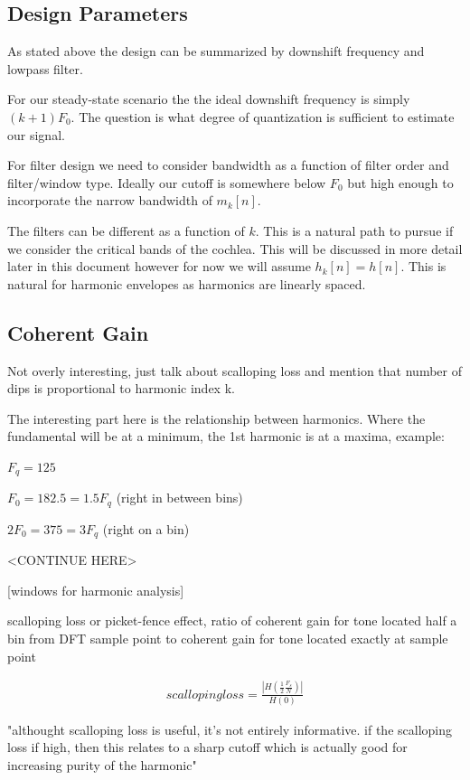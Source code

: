 \documentclass [11pt, proquest] {uwthesis}[2015/03/03]
\begin{document}
\subsection{Design Parameters}

As stated above the design can be summarized by downshift frequency and lowpass filter.

For our steady-state scenario the the ideal downshift frequency is simply $(k+1)F_0$.  The question is what degree of quantization is sufficient to estimate our signal.

For filter design we need to consider bandwidth as a function of filter order and filter/window type.  Ideally our cutoff is somewhere below $F_0$ but high enough to incorporate the narrow bandwidth of $m_k[n]$.

The filters can be different as a function of $k$.  This is a natural path to pursue if we consider the critical bands of the cochlea.  This will be discussed in more detail later in this document however for now we will assume $h_k[n] = h[n]$.  This is natural for harmonic envelopes as harmonics are linearly spaced.

\subsection{Coherent Gain}

Not overly interesting, just talk about scalloping loss and mention that number of dips is proportional to harmonic index k.

The interesting part here is the relationship between harmonics.  Where the fundamental will be at a minimum, the 1st harmonic is at a maxima, example:

$F_q = 125$

$F_0 = 182.5 = 1.5 F_q$ (right in between bins)

$2F_0 = 375 = 3 F_q$ (right on a bin)

<CONTINUE HERE>

[windows for harmonic analysis]

scalloping loss or picket-fence effect, ratio of coherent gain for tone located half a bin from DFT sample point to coherent gain for tone located exactly at sample point

\begin{align}
scalloping loss = \frac{| H(\frac{1}{2} \frac{F_s}{N}) |}{H(0)}
\end{align}

"althought scalloping loss is useful, it's not entirely informative.  if the scalloping loss if high, then this relates to a sharp cutoff which is actually good for increasing purity of the harmonic"
\end{document}
